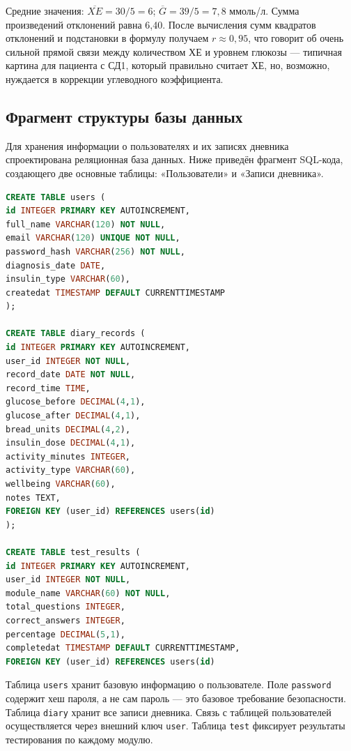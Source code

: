 \documentclass[14pt, a4paper]{extarticle}
\begin{document}
\noindent Средние значения: $\overline{XE}=30/5=6$; $\overline{G}=39/5=7{,}8$ ммоль/л. Сумма произведений отклонений равна 6,40. После вычисления сумм квадратов отклонений и подстановки в формулу получаем $r\approx0{,}95$, что говорит об очень сильной прямой связи между количеством ХЕ и уровнем глюкозы — типичная картина для пациента с СД1, который правильно считает ХЕ, но, возможно, нуждается в коррекции углеводного коэффициента.
\vskip 9cm
\subsection{Фрагмент структуры базы данных}

\noindent Для хранения информации о пользователях и их записях дневника спроектирована реляционная база данных. Ниже приведён фрагмент SQL-кода, создающего две основные таблицы: «Пользователи» и «Записи дневника».

\begin{lstlisting}[style=portalcode, language=SQL, caption={Фрагмент SQL-структуры электронного дневника}]
CREATE TABLE users (
id INTEGER PRIMARY KEY AUTOINCREMENT,
full_name VARCHAR(120) NOT NULL,
email VARCHAR(120) UNIQUE NOT NULL,
password_hash VARCHAR(256) NOT NULL,
diagnosis_date DATE,
insulin_type VARCHAR(60),
createdat TIMESTAMP DEFAULT CURRENTTIMESTAMP
);

CREATE TABLE diary_records (
id INTEGER PRIMARY KEY AUTOINCREMENT,
user_id INTEGER NOT NULL,
record_date DATE NOT NULL,
record_time TIME,
glucose_before DECIMAL(4,1),
glucose_after DECIMAL(4,1),
bread_units DECIMAL(4,2),
insulin_dose DECIMAL(4,1),
activity_minutes INTEGER,
activity_type VARCHAR(60),
wellbeing VARCHAR(60),
notes TEXT,
FOREIGN KEY (user_id) REFERENCES users(id)
);

CREATE TABLE test_results (
id INTEGER PRIMARY KEY AUTOINCREMENT,
user_id INTEGER NOT NULL,
module_name VARCHAR(60) NOT NULL,
total_questions INTEGER,
correct_answers INTEGER,
percentage DECIMAL(5,1),
completedat TIMESTAMP DEFAULT CURRENTTIMESTAMP,
FOREIGN KEY (user_id) REFERENCES users(id)
\end{lstlisting}

\noindent Таблица \texttt{users} хранит базовую информацию о пользователе. Поле \texttt{password\hash} содержит хеш пароля, а не сам пароль — это базовое требование безопасности. Таблица \texttt{diary\records} хранит все записи дневника. Связь с таблицей пользователей осуществляется через внешний ключ \texttt{user\id}. Таблица \texttt{test\results} фиксирует результаты тестирования по каждому модулю.
\end{document}
